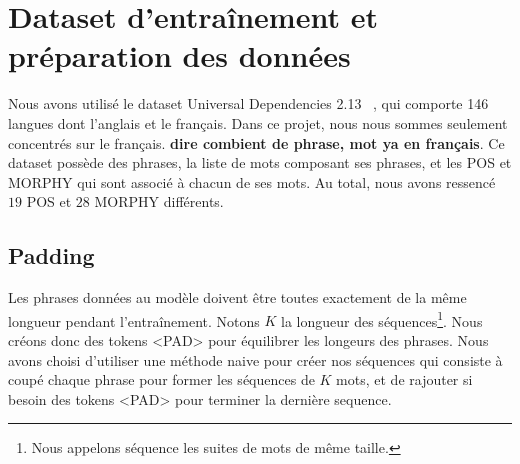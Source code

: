 \documentclass[a4paper]{article}
\begin{document}







\section{Dataset d'entraînement et préparation des données}

Nous avons utilisé le dataset Universal Dependencies 2.13 ~\cite{11234/1-5287}, qui comporte 146 langues dont l'anglais
et le français. Dans ce projet, nous nous sommes seulement concentrés sur le français.
\textbf{dire combient de phrase, mot ya en français}. Ce dataset possède des phrases, la liste de mots composant ses phrases,
et les POS et MORPHY qui sont associé à chacun de ses mots. Au total, nous avons ressencé $19$ POS et $28$ MORPHY différents.

\subsection{Padding}

Les phrases données au modèle doivent être toutes exactement de la même longueur pendant l'entraînement. 
Notons $K$ la longueur des séquences\footnote{Nous appelons séquence les suites de mots de même taille.}. Nous créons donc des tokens <PAD> pour équilibrer les longeurs des phrases.
Nous avons choisi d'utiliser une méthode naive pour créer nos séquences qui consiste à coupé chaque phrase pour former les séquences
de $K$ mots, et de rajouter si besoin des tokens <PAD> pour terminer la dernière sequence.
\end{document}
